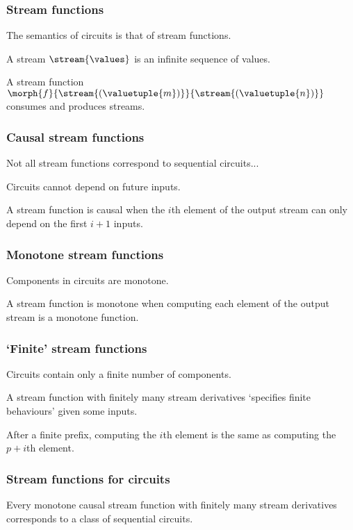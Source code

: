 \begin{frame}
    \frametitle{Stream functions}

    The semantics of circuits is that of \alert{stream functions}.

    \wait

    A \alert{stream} \(\stream{\values}\) is an infinite sequence of values.
    
    \wait
    
    A \alert{stream function} \(\morph{f}{\stream{(\valuetuple{m})}}{\stream{(\valuetuple{n})}}\) consumes and produces streams.

\end{frame}

\begin{frame}
    \frametitle{Causal stream functions}

    Not all stream functions correspond to sequential circuits...

    \wait

    Circuits cannot depend on \alert{future inputs}.

    \wait

    A stream function is \alert{causal} when the \(i\)th element of the output stream can only depend on the first \(i+1\) inputs.

\end{frame}

\begin{frame}
    \frametitle{Monotone stream functions}

    Components in circuits are \alert{monotone}.

    \wait

    A stream function is \alert{monotone} when computing each element of the output stream is a monotone function.

\end{frame}

\begin{frame}
    \frametitle{`Finite' stream functions}

    Circuits contain only a finite number of components.

    \wait

    A stream function with \alert{finitely many stream derivatives} `specifies finite behaviours' given some inputs.

    \wait

    After a finite prefix, computing the \(i\)th element is the same as computing the \(p+i\)th element.

\end{frame}

\begin{frame}
    \frametitle{Stream functions for circuits}
    \begin{theorem}
        Every monotone causal stream function with finitely many stream derivatives corresponds to a class of sequential circuits. 
    \end{theorem}
\end{frame}